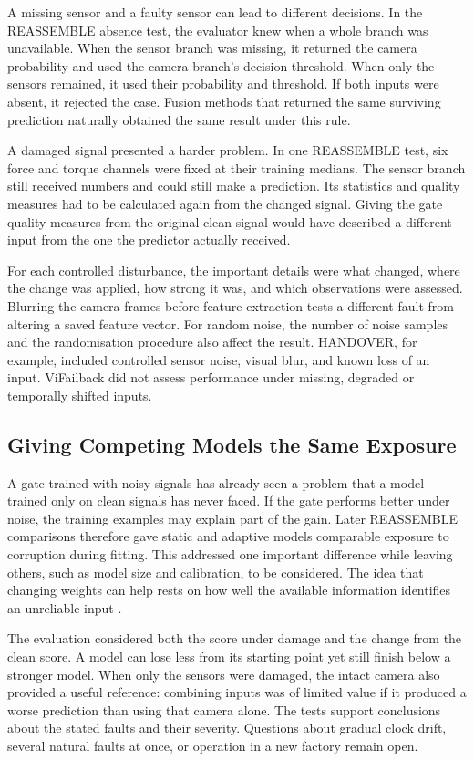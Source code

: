 A missing sensor and a faulty sensor can lead to different decisions. In the REASSEMBLE
absence test, the evaluator knew when a whole branch was unavailable. When the sensor
branch was missing, it returned the camera probability and used the camera branch's
decision threshold. When only the sensors remained, it used their probability and
threshold. If both inputs were absent, it rejected the case. Fusion methods that
returned the same surviving prediction naturally obtained the same result under this
rule.

A damaged signal presented a harder problem. In one REASSEMBLE test, six force and
torque channels were fixed at their training medians. The sensor branch still received
numbers and could still make a prediction. Its statistics and quality measures had to be
calculated again from the changed signal. Giving the gate quality measures from the
original clean signal would have described a different input from the one the predictor
actually received.

For each controlled disturbance, the important details were what changed, where the
change was applied, how strong it was, and which observations were assessed. Blurring
the camera frames before feature extraction tests a different fault from altering a
saved feature vector. For random noise, the number of noise samples and the
randomisation procedure also affect the result. HANDOVER, for example, included
controlled sensor noise, visual blur, and known loss of an input. ViFailback did not assess performance under missing,
degraded or temporally shifted inputs.

\subsection{Giving Competing Models the Same Exposure}

A gate trained with noisy signals has already seen a problem that a model trained only
on clean signals has never faced. If the gate performs better under noise, the training
examples may explain part of the gain. Later REASSEMBLE comparisons therefore gave
static and adaptive models comparable exposure to corruption during fitting. This
addressed one important difference while leaving others, such as model size and
calibration, to be considered. The idea that changing weights can help rests on how well
the available information identifies an unreliable input \parencite{Zhang2023QMF}.

The evaluation considered both the score under damage and the change from the clean
score. A model can lose less from its starting point yet still finish below a stronger
model. When only the sensors were damaged, the intact camera also provided a useful
reference: combining inputs was of limited value if it produced a worse prediction than
using that camera alone. The tests support conclusions about the stated faults and their
severity. Questions about gradual clock drift, several natural faults at once, or
operation in a new factory remain open.

